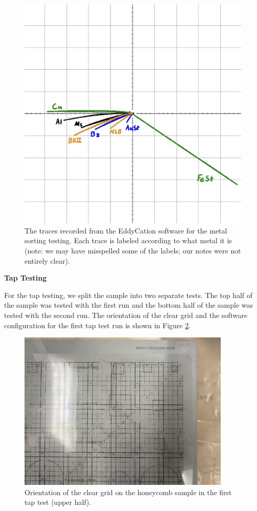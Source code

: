 \documentclass[12 pt]{report}
\begin{document}
\begin{figure}[htbp]
	\centering
	\includegraphics[width=6in]{images/graphs/eddy current testing/S4G2Metal2-labeled}
	\caption{The traces recorded from the EddyCation software for the metal sorting testing. Each trace is labeled according to what metal it is (note: we may have misspelled some of the labels; our notes were not entirely clear).}
	\label{fig:ec_metal_sorting}
\end{figure}

\textbf{Tap Testing}

For the tap testing, we split the sample into two separate tests. The top half of the sample was tested with the first run and the bottom half of the sample was tested with the second run. The orientation of the clear grid and the software configuration for the first tap test run is shown in Figure \ref{fig:tt1_orientation}.

\begin{figure}[htbp]
	\centering
	\includegraphics[width=4in]{images/graphs/tap testing/S4G2tap1-orientation}
	\caption{Orientation of the clear grid on the honeycomb sample in the first tap test (upper half).}
	\label{fig:tt1_orientation}
\end{figure}
\end{document}
